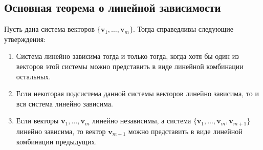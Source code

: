 \documentclass[10pt]{article}
\begin{document}
\subsection*{Основная теорема о линейной зависимости}

\begin{theorem}\label{th:linind}
Пусть дана система векторов \(\{\mathbf{v}_1, \dots, \mathbf{v}_m\}\). Тогда справедливы следующие утверждения:
\begin{enumerate}
    \item Система линейно зависима тогда и только тогда, когда хотя бы один из векторов этой системы можно представить в виде линейной комбинации остальных.
    \item Если некоторая подсистема данной системы векторов линейно зависима, то и вся система линейно зависима.
    \item\label{pt:addvec} Если векторы \(\mathbf{v}_1, \dots, \mathbf{v}_m\) линейно независимы, а система \(\{\mathbf{v}_1, \dots, \mathbf{v}_m, \mathbf{v}_{m+1}\}\) линейно зависима, то вектор \(\mathbf{v}_{m+1}\) можно представить в виде линейной комбинации предыдущих.
\end{enumerate}
\end{theorem}
\end{document}
